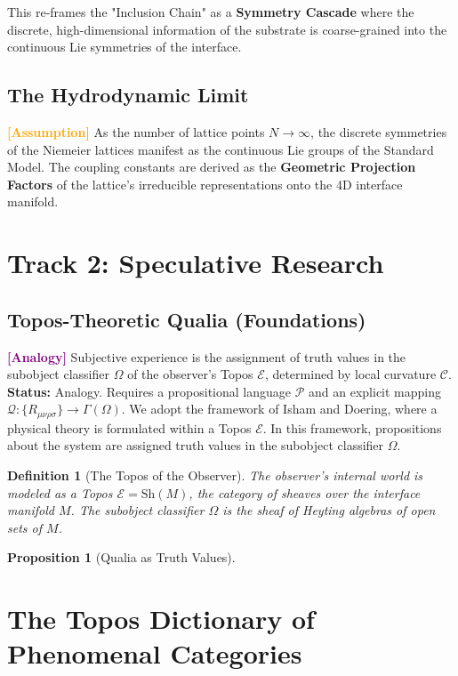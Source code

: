 \documentclass[11pt,titlepage]{article}
\newcommand{\curvature}{\mathcal{C}}
\newcommand{\topos}{\mathcal{E}}
\newcommand{\classifier}{\Omega}
\newcommand{\tagass}{\textcolor{orange}{\textbf{[Assumption]}} }
\newcommand{\taganal}{\textcolor{purple}{\textbf{[Analogy]}} }
\newtheorem{proposition}{Proposition}[section]
\newtheorem{definition}{Definition}[section]
\begin{document}
This re-frames the "Inclusion Chain" as a \textbf{Symmetry Cascade} where the discrete, high-dimensional information of the substrate is coarse-grained into the continuous Lie symmetries of the interface.


\subsection{The Hydrodynamic Limit}
\tagass As the number of lattice points $N \to \infty$, the discrete symmetries of the Niemeier lattices manifest as the continuous Lie groups of the Standard Model. The coupling constants are derived as the \textbf{Geometric Projection Factors} of the lattice's irreducible representations onto the 4D interface manifold.

\section{Track 2: Speculative Research}

\subsection{Topos-Theoretic Qualia (Foundations)}
\taganal Subjective experience is the assignment of truth values in the subobject classifier $\classifier$ of the observer's Topos $\topos$, determined by local curvature $\curvature$.
\textbf{Status:} Analogy. Requires a propositional language $\mathcal{P}$ and an explicit mapping $\mathcal{Q}: \{R_{\mu\nu\rho\sigma}\} \to \Gamma(\Omega)$. We adopt the framework of Isham and Doering, where a physical theory is formulated within a Topos $\topos$. In this framework, propositions about the system are assigned truth values in the subobject classifier $\classifier$.

\begin{definition}[The Topos of the Observer]
The observer's internal world is modeled as a Topos $\topos = \text{Sh}(M)$, the category of sheaves over the interface manifold $M$. The subobject classifier $\classifier$ is the sheaf of Heyting algebras of open sets of $M$.
\end{definition}

\begin{proposition}[Qualia as Truth Values]

\end{proposition}


\section{The Topos Dictionary of Phenomenal Categories}
\end{document}
